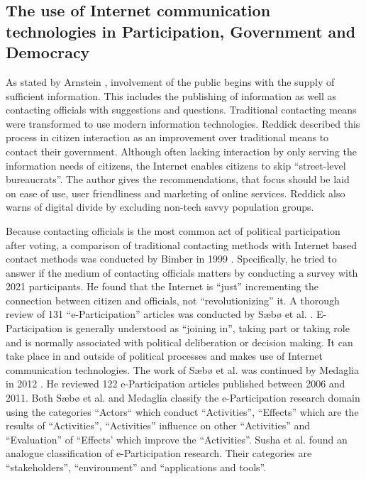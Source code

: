 \subsection{The use of Internet communication technologies in Participation, Government and Democracy}
As stated by Arnstein \cite{Arnstein1969_citizen_participation}, involvement of the public begins with the supply of sufficient information. This includes the publishing of information as well as contacting officials with suggestions and questions. Traditional contacting means were transformed to use modern information technologies. Reddick \cite{Reddick2005_Citizen_interaction_with_egovernment} described this process in citizen interaction as an improvement over traditional means to contact their government. Although often lacking interaction by only serving the information needs of citizens, the Internet enables citizens to skip ``street-level bureaucrats''. The author gives the recommendations, that focus should be laid on ease of use, user friendliness and marketing of online services. Reddick also warns of digital divide by excluding non-tech savvy population groups.

Because contacting officials is the most common act of political participation after voting, a comparison of traditional contacting methods with Internet based contact methods was conducted by Bimber in 1999 \cite{Bimber1999_Citizen_communication_with_government}. Specifically, he tried to answer if the medium of contacting officials matters by conducting a survey with 2021 participants. He found that the Internet is ``just'' incrementing the connection between citizen and officials, not ``revolutionizing'' it.
A thorough review of 131 ``e-Participation'' articles was conducted by S{\ae}b{\o} et al. \cite{Saebo_eParticipation}. E-Participation is generally understood as ``joining in'', taking part or taking role and is normally associated with political deliberation or decision making. It can take place in and outside of political processes and makes use of Internet communication technologies. The work of S{\ae}b{\o} et al. was continued by Medaglia in 2012 \cite{Medaglia2012_eParticipation}. He reviewed 122 e-Participation articles published between 2006 and 2011. Both S{\ae}b{\o} et al. and Medaglia classify the e-Participation research domain using the categories ``Actors`` which conduct ``Activities'', ``Effects'' which are the results of ``Activities'', ``Activities'' influence on other ``Activities'' and ``Evaluation'' of ``Effects' which improve the ``Activities''. Susha et al. \cite{Susha2012_eParticipation} found an analogue classification of e-Participation research. Their categories are ``stakeholders'', ``environment'' and ``applications and tools''. 

